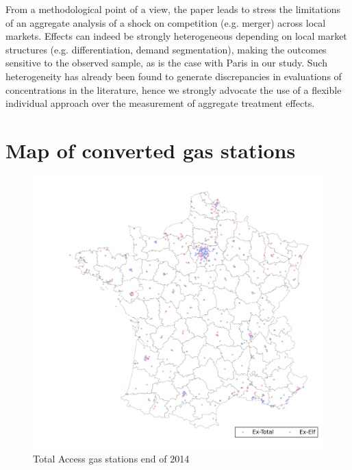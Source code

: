 \documentclass[english]{article}
\begin{document}
From a methodological point of a view, the paper leads to stress the limitations of an aggregate analysis of a shock on competition (e.g. merger) across local markets. Effects can indeed be strongly heterogeneous depending on local market structures (e.g. differentiation, demand segmentation), making the outcomes sensitive to the observed sample, as is the case with Paris in our study. Such heterogeneity has already been found to generate discrepancies in evaluations of concentrations in the literature, hence we strongly advocate the use of a flexible individual approach over the measurement of aggregate treatment effects.

\newpage



\newpage

\appendix

\section*{Map of converted gas stations}

\begin{figure}[H]
	\centering
		\includegraphics[width=16cm]{graphs/map_total_access.png}
\caption{Total Access gas stations end of 2014}
\label{figure:map_ta}
\end{figure}
\end{document}
